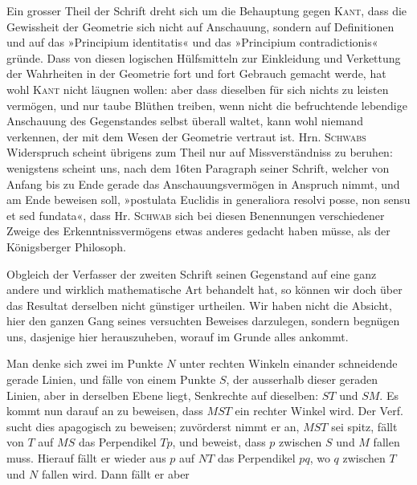 Ein grosser Theil der Schrift dreht sich um die Behauptung gegen \textsc{Kant}, dass die
Gewissheit der Geometrie sich nicht auf Anschauung, sondern auf Definitionen und auf das
»Principium identitatis« und das »Principium contradictionis« gründe. Dass von diesen
logischen Hülfsmitteln zur Einkleidung und Verkettung der Wahrheiten in der Geometrie fort
und fort Gebrauch gemacht werde, hat wohl \textsc{Kant} nicht läugnen wollen: aber dass
dieselben für sich nichts zu leisten vermögen, und nur taube Blüthen treiben, wenn nicht die
befruchtende lebendige Anschauung des Gegenstandes selbst überall waltet, kann wohl niemand
verkennen, der mit dem Wesen der Geometrie vertraut ist. Hrn. \textsc{Schwabs} Widerspruch
scheint übrigens zum Theil nur auf Missverständniss zu beruhen: wenigstens scheint uns, nach
dem 16ten Paragraph seiner Schrift, welcher von Anfang bis zu Ende gerade das
Anschauungsvermögen in Anspruch nimmt, und am Ende beweisen soll, »postulata Euclidis in
generaliora resolvi posse, non sensu et  sed  fundata«, dass Hr.
\textsc{Schwab} sich bei diesen Benennungen verschiedener Zweige des Erkenntnissvermögens
etwas anderes gedacht haben müsse, als der Königsberger Philosoph.

Obgleich der Verfasser der zweiten Schrift seinen Gegenstand auf eine ganz andere und
wirklich mathematische Art behandelt hat, so können wir doch über das Resultat derselben
nicht günstiger urtheilen. Wir haben nicht die Absicht, hier den ganzen Gang seines
versuchten Beweises darzulegen, sondern begnügen uns, dasjenige hier herauszuheben, worauf
im Grunde alles ankommt.

\begin{center}\end{center}

Man denke sich zwei im Punkte $N$ unter rechten Winkeln einander schneidende gerade Linien,
und fälle von einem Punkte $S$, der ausserhalb dieser geraden Linien, aber in derselben
Ebene liegt, Senkrechte auf dieselben: $ST$ und $SM$. Es kommt nun darauf an zu beweisen,
dass $MST$ ein rechter Winkel wird. Der Verf. sucht dies apagogisch zu beweisen;
zuvörderst nimmt er an, $MST$ sei spitz, fällt von $T$ auf $MS$ das Perpendikel $Tp$, und
beweist, dass $p$ zwischen $S$ und $M$ fallen muss. Hierauf fällt er wieder aus $p$ auf $NT$ das Perpendikel $pq$, wo $q$ zwischen $T$ und $N$ fallen wird. Dann fällt er aber%
